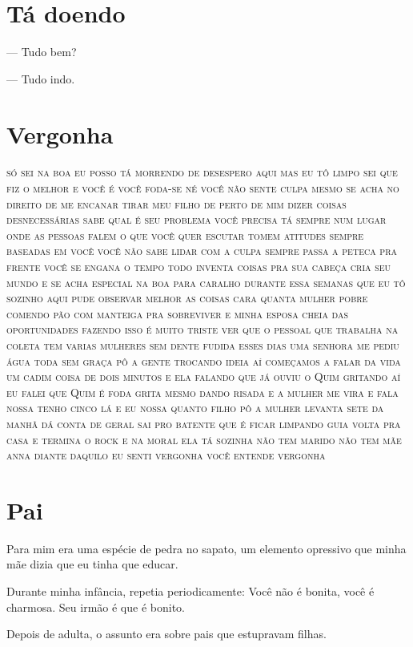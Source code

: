 {{\chapter{Tá doendo}\label{tuxe1-doendo}

--- Tudo bem?

--- Tudo indo.


\chapter{Vergonha}\label{vergonha}

\textsc{só sei na boa eu posso tá morrendo de desespero aqui mas eu tô
limpo sei que fiz o melhor e você é você foda-se né você não sente culpa
mesmo se acha no direito de me encanar tirar meu filho de perto de mim
dizer coisas desnecessárias sabe qual é seu problema você precisa tá
sempre num lugar onde as pessoas falem o que você quer escutar tomem
atitudes sempre baseadas em você você não sabe lidar com a culpa sempre
passa a peteca pra frente você se engana o tempo todo inventa coisas pra
sua cabeça cria seu mundo e se acha especial na boa para caralho durante
essa semanas que eu tô sozinho aqui pude observar melhor as coisas cara
quanta mulher pobre comendo pão com manteiga pra sobreviver e minha
esposa cheia das oportunidades fazendo isso é muito triste ver que o
pessoal que trabalha na coleta tem varias mulheres sem dente fudida
esses dias uma senhora me pediu água toda sem graça pô a gente trocando
ideia aí começamos a falar da vida um cadim coisa de dois minutos e ela
falando que já ouviu o Quim gritando aí eu falei que Quim é foda grita
mesmo dando risada e a mulher me vira e fala nossa tenho cinco lá e eu
nossa quanto filho pô a mulher levanta sete da manhã dá conta de geral
sai pro batente que é ficar limpando guia volta pra casa e termina o
rock e na moral ela tá sozinha não tem marido não tem mãe anna diante
daquilo eu senti vergonha você entende vergonha }

\chapter{Pai}

Para mim era uma espécie de pedra no sapato, um elemento opressivo que
minha mãe dizia que eu tinha que educar.

Durante minha infância, repetia periodicamente: Você não é bonita, você
é charmosa. Seu irmão é que é bonito.

Depois de adulta, o assunto era sobre pais que estupravam filhas.

}}
